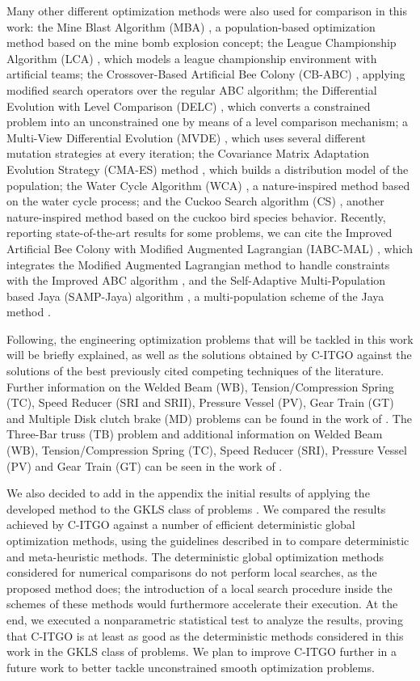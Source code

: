 Many other different optimization methods were also used for comparison in this work: the Mine Blast Algorithm (MBA) \citep{MBA}, a population-based optimization method based on the mine bomb explosion concept; the League Championship Algorithm (LCA) \citep{LCA}, which models a league championship environment with artificial teams; the Crossover-Based Artificial Bee Colony (CB-ABC) \citep{CB-ABC}, applying modified search operators over the regular ABC algorithm; the Differential Evolution with Level Comparison (DELC) \citep{DELC}, which converts a constrained problem into an unconstrained one by means of a level comparison mechanism; a Multi-View Differential Evolution (MVDE) \citep{MVDE}, which uses several different mutation strategies at every iteration; the Covariance Matrix Adaptation Evolution Strategy (CMA-ES) method \citep{CMA-ES}, which builds a distribution model of the population; the Water Cycle Algorithm (WCA) \citep{WCA}, a nature-inspired method based on the water cycle process; and the Cuckoo Search algorithm (CS) \citep{CS}, another nature-inspired method based on the cuckoo bird species behavior. Recently, reporting state-of-the-art results for some problems, we can cite the Improved Artificial Bee Colony with Modified Augmented Lagrangian (IABC-MAL) \citep{IABC-Mal}, which integrates the Modified Augmented Lagrangian method to handle constraints with the Improved ABC algorithm \citep{IABC}, and the Self-Adaptive Multi-Population based Jaya (SAMP-Jaya) algorithm \citep{SAMP-Jaya}, a multi-population scheme of the Jaya method \citep{Jaya}.


Following, the engineering optimization problems that will be tackled in this work will be briefly explained, as well as the solutions obtained by C-ITGO against the solutions of the best previously cited competing techniques of the literature. Further information on the Welded Beam (WB), Tension/Compression Spring (TC), Speed Reducer (SRI and SRII), Pressure Vessel (PV), Gear Train (GT) and Multiple Disk clutch brake (MD) problems can be found in the work of \cite{IAPSO}. The Three-Bar truss (TB) problem and additional information on Welded Beam (WB), Tension/Compression Spring (TC), Speed Reducer (SRI), Pressure Vessel (PV) and Gear Train (GT) can be seen in the work of \cite{MBA}.


We also decided to add in the appendix the initial results of applying the developed method to the GKLS class of problems \citep{GKLS}. We compared the results achieved by C-ITGO against a number of efficient deterministic global optimization methods, using the guidelines described in \cite{NAT} to compare deterministic and meta-heuristic methods. The deterministic global optimization methods considered for numerical comparisons do not perform local searches, as the proposed method does; the introduction of a local search procedure inside the schemes of these methods would furthermore accelerate their execution. At the end, we executed a nonparametric statistical test to analyze the results, proving that C-ITGO is at least as good as the deterministic methods considered in this work in the GKLS class of problems. We plan to improve C-ITGO further in a future work to better tackle unconstrained smooth optimization problems.



